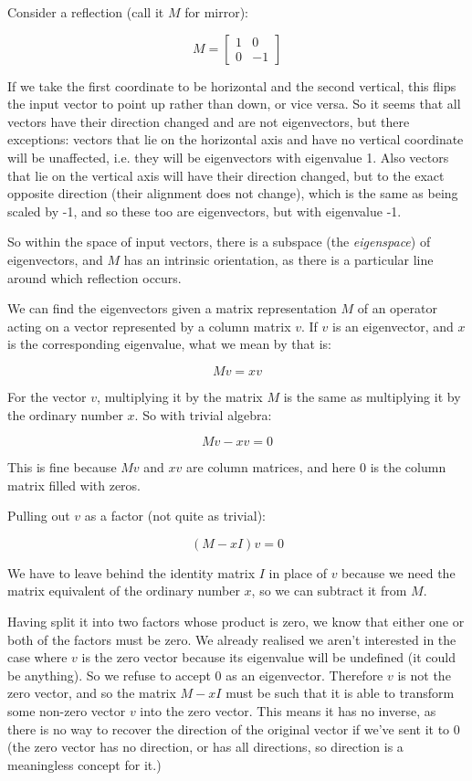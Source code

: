 Consider a reflection (call it $M$ for mirror):

$$M = \begin{bmatrix}1 & 0 \\ 0 & -1\end{bmatrix}$$

If we take the first coordinate to be horizontal and the second vertical, this flips the input vector to point up rather than down, or vice versa. So it seems that all vectors have their direction changed and are not eigenvectors, but there exceptions: vectors that lie on the horizontal axis and have no vertical coordinate will be unaffected, i.e. they will be eigenvectors with eigenvalue 1. Also vectors that lie on the vertical axis will have their direction changed, but to the exact opposite direction (their alignment does not change), which is the same as being scaled by -1, and so these too are eigenvectors, but with eigenvalue -1.

So within the space of input vectors, there is a subspace (the \textit{eigenspace}) of eigenvectors, and $M$ has an intrinsic orientation, as there is a particular line around which reflection occurs.

We can find the eigenvectors given a matrix representation $M$ of an operator acting on a vector represented by a column matrix $v$. If $v$ is an eigenvector, and $x$ is the corresponding eigenvalue, what we mean by that is:

$$Mv = xv$$

For the vector $v$, multiplying it by the matrix $M$ is the same as multiplying it by the ordinary number $x$. So with trivial algebra:

$$Mv - xv = 0$$

This is fine because $Mv$ and $xv$ are column matrices, and here $0$ is the column matrix filled with zeros.

Pulling out $v$ as a factor (not quite as trivial):

$$(M - xI)v = 0$$

We have to leave behind the identity matrix $I$ in place of $v$ because we need the matrix equivalent of the ordinary number $x$, so we can subtract it from $M$.

Having split it into two factors whose product is zero, we know that either one or both of the factors must be zero. We already realised we aren't interested in the case where $v$ is the zero vector because its eigenvalue will be undefined (it could be anything). So we refuse to accept $0$ as an eigenvector. Therefore $v$ is not the zero vector, and so the matrix $M - xI$ must be such that it is able to transform some non-zero vector $v$ into the zero vector. This means it has no inverse, as there is no way to recover the direction of the original vector if we've sent it to $0$ (the zero vector has no direction, or has all directions, so direction is a meaningless concept for it.)

